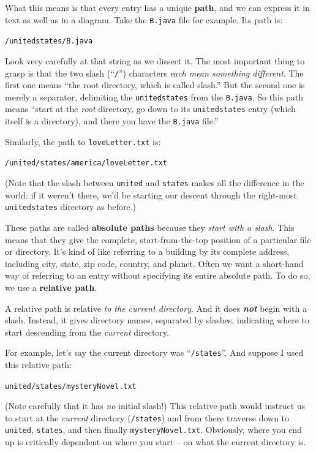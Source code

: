 What this means is that every entry has a unique \textbf{path}, and we can
express it in text as well as in a diagram. Take the \texttt{B.java} file for
example. Its path is:

\quad\quad \texttt{/unitedstates/B.java}

Look very carefully at that string as we dissect it. The most important thing
to grasp is that the two slash (``\texttt{/}'') characters \textit{each mean
something different}. The first one means ``the root directory, which is called
slash.'' But the second one is merely a separator, delimiting the
\texttt{unitedstates} from the \texttt{B.java}. So this path means
``start at the \textit{root} directory, go down to its \texttt{unitedstates}
entry (which itself is a directory), and there you have the \texttt{B.java}
file.''

Similarly, the path to \texttt{loveLetter.txt} is:

\quad\quad \texttt{/united/states/america/loveLetter.txt}

(Note that the slash between \texttt{united} and \texttt{states} makes all the
difference in the world: if it weren't there, we'd be starting our descent
through the right-most \texttt{unitedstates} directory as before.)

These paths are called \textbf{absolute paths} because they \textit{start with
a slash}. This means that they give the complete, start-from-the-top position
of a particular file or directory. It's kind of like referring to a building
by its complete address, including city, state, zip code, country, and planet.
Often we want a short-hand way of referring to an entry without specifying its
entire absolute path. To do so, we use a \textbf{relative path}.

A relative path is relative \textit{to the current directory}. And it does
\textit{\textbf{not}} begin with a slash. Instead, it gives directory names,
separated by slashes, indicating where to start descending from the
\textit{current} directory.

For example, let's say the current directory was ``\texttt{/states}''. And
suppose I used this relative path:

\quad\quad \texttt{united/states/mysteryNovel.txt}

(Note carefully that it has \textit{no} initial slash!) This relative path
would instruct us to start at the \textit{current} directory (\texttt{/states})
and from there traverse down to \texttt{united}, \texttt{states}, and then
finally \texttt{mysteryNovel.txt}. Obviously, where you end up is critically
dependent on where you start -- on what the current directory is.

